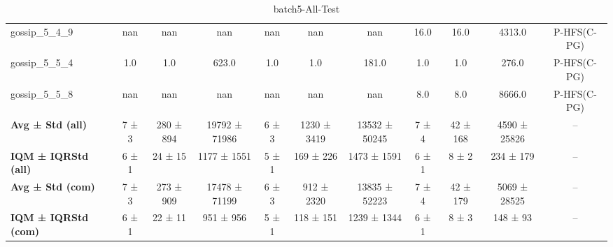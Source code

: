 \begin{table}[!ht]
\begin{tabular}{l|ccc|ccc|cccc}
gossip\_5\_4\_9 & nan & nan & nan & nan & nan & nan & 16.0 & 16.0 & 4313.0 & P-HFS(C-PG) \\
gossip\_5\_5\_4 & 1.0 & 1.0 & 623.0 & 1.0 & 1.0 & 181.0 & 1.0 & 1.0 & 276.0 & P-HFS(C-PG) \\
gossip\_5\_5\_8 & nan & nan & nan & nan & nan & nan & 8.0 & 8.0 & 8666.0 & P-HFS(C-PG) \\
\hline
\textbf{Avg ± Std (all)} & 7 ± 3 & 280 ± 894 & 19792 ± 71986 & 6 ± 3 & 1230 ± 3419 & 13532 ± 50245 & 7 ± 4 & 42 ± 168 & 4590 ± 25826 & -- \\
\textbf{IQM ± IQRStd (all)} & 6 ± 1 & 24 ± 15 & 1177 ± 1551 & 5 ± 1 & 169 ± 226 & 1473 ± 1591 & 6 ± 1 & 8 ± 2 & 234 ± 179 & -- \\
\textbf{Avg ± Std (com)} & 7 ± 3 & 273 ± 909 & 17478 ± 71199 & 6 ± 3 & 912 ± 2320 & 13835 ± 52223 & 7 ± 4 & 42 ± 179 & 5069 ± 28525 & -- \\
\textbf{IQM ± IQRStd (com)} & 6 ± 1 & 22 ± 11 & 951 ± 956 & 5 ± 1 & 118 ± 151 & 1239 ± 1344 & 6 ± 1 & 8 ± 3 & 148 ± 93 & -- \\
\end{tabular}
\caption{batch5-All-Test}
\label{tab:batch5_All_comparison_test}
\end{table}
